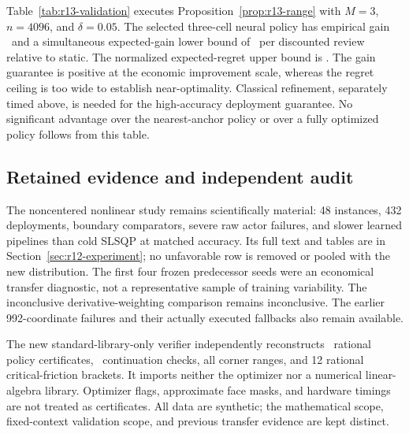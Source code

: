 Table~\ref{tab:r13-validation} executes Proposition~\ref{prop:r13-range} with $M=3$, $n=4096$, and $\delta=0.05$. The selected three-cell neural policy has empirical gain \RThirteenGain\ and a simultaneous expected-gain lower bound of \RThirteenGainFloor\ per discounted review relative to static. The normalized expected-regret upper bound is \RThirteenRegret. The gain guarantee is positive at the economic improvement scale, whereas the regret ceiling is too wide to establish near-optimality. Classical refinement, separately timed above, is needed for the high-accuracy deployment guarantee. No significant advantage over the nearest-anchor policy or over a fully optimized policy follows from this table.


\subsection{Retained evidence and independent audit}
The noncentered nonlinear study remains scientifically material: 48 instances, 432 deployments, boundary comparators, severe raw actor failures, and slower learned pipelines than cold SLSQP at matched accuracy. Its full text and tables are in Section~\ref{sec:r12-experiment}; no unfavorable row is removed or pooled with the new distribution. The first four frozen predecessor seeds were an economical transfer diagnostic, not a representative sample of training variability. The inconclusive derivative-weighting comparison remains inconclusive. The earlier 992-coordinate failures and their actually executed fallbacks also remain available.

The new standard-library-only verifier independently reconstructs \RThirteenPolicies\ rational policy certificates, \RThirteenChecks\ continuation checks, all corner ranges, and 12 rational critical-friction brackets. It imports neither the optimizer nor a numerical linear-algebra library. Optimizer flags, approximate face masks, and hardware timings are not treated as certificates. All data are synthetic; the mathematical scope, fixed-context validation scope, and previous transfer evidence are kept distinct.
